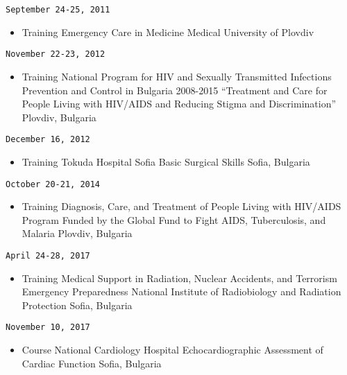 \documentclass[
  12pt,
  letterpaper,
  DIV=11,
  numbers=noendperiod]{scrartcl}
\providecommand{\tightlist}{%
  \setlength{\itemsep}{0pt}\setlength{\parskip}{0pt}}\usepackage{longtable,booktabs,array}
\begin{document}
\texttt{September\ 24-25,\ 2011}

\begin{itemize}
\tightlist
\item
  Training \textbar{} Emergency Care in Medicine \textbar{} Medical
  University of Plovdiv
\end{itemize}

\texttt{November\ 22-23,\ 2012}

\begin{itemize}
\tightlist
\item
  Training\textbar{} National Program for HIV and Sexually Transmitted
  Infections Prevention and Control in Bulgaria 2008-2015 \textbar{}
  ``Treatment and Care for People Living with HIV/AIDS and Reducing
  Stigma and Discrimination'' \textbar{} Plovdiv, Bulgaria
\end{itemize}

\texttt{December\ 16,\ 2012}

\begin{itemize}
\tightlist
\item
  Training\textbar{} Tokuda Hospital Sofia \textbar{} Basic Surgical
  Skills \textbar{} Sofia, Bulgaria
\end{itemize}

\texttt{October\ 20-21,\ 2014}

\begin{itemize}
\tightlist
\item
  Training \textbar{} Diagnosis, Care, and Treatment of People Living
  with HIV/AIDS \textbar{} Program Funded by the Global Fund to Fight
  AIDS, Tuberculosis, and Malaria \textbar{} Plovdiv, Bulgaria
\end{itemize}

\texttt{April\ 24-28,\ 2017}

\begin{itemize}
\tightlist
\item
  Training \textbar{} Medical Support in Radiation, Nuclear Accidents,
  and Terrorism Emergency Preparedness \textbar{} National Institute of
  Radiobiology and Radiation Protection \textbar{} Sofia, Bulgaria
\end{itemize}

\texttt{November\ 10,\ 2017}

\begin{itemize}
\tightlist
\item
  Course \textbar{} National Cardiology Hospital \textbar{}
  Echocardiographic Assessment of Cardiac Function \textbar{} Sofia,
  Bulgaria
\end{itemize}
\end{document}
